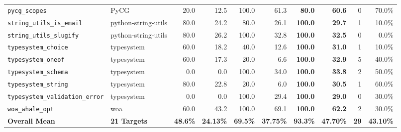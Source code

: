 \documentclass[conference]{IEEEtran}
\begin{document}
\begin{table}[t]
\begin{tabular}{ll|rr|rr|rrr|r}
\texttt{pycg\_scopes} & PyCG & 20.0 & 12.5 & 100.0 & 61.3 & \textbf{80.0} & \textbf{60.6} & 0 & 70.0\% \\
\texttt{string\_utils\_is\_email} & python-string-utils & 80.0 & 24.2 & 80.0 & 26.1 & \textbf{100.0} & \textbf{29.7} & 1 & 10.0\% \\
\texttt{string\_utils\_slugify} & python-string-utils & 80.0 & 26.2 & 100.0 & 32.8 & \textbf{100.0} & \textbf{32.5} & 0 & 0.0\% \\
\texttt{typesystem\_choice} & typesystem & 60.0 & 18.2 & 40.0 & 12.6 & \textbf{100.0} & \textbf{31.0} & 1 & 10.0\% \\
\texttt{typesystem\_oneof} & typesystem & 60.0 & 17.3 & 20.0 & 6.6 & \textbf{100.0} & \textbf{32.9} & 5 & 40.0\% \\
\texttt{typesystem\_schema} & typesystem & 0.0 & 0.0 & 100.0 & 34.0 & \textbf{100.0} & \textbf{33.8} & 2 & 50.0\% \\
\texttt{typesystem\_string} & typesystem & 80.0 & 22.8 & 20.0 & 6.0 & \textbf{100.0} & \textbf{30.5} & 1 & 60.0\% \\
\texttt{typesystem\_validation\_error} & typesystem & 0.0 & 0.0 & 100.0 & 29.4 & \textbf{100.0} & \textbf{29.0} & 0 & 30.0\% \\
\texttt{woa\_whale\_opt} & woa & 60.0 & 43.2 & 100.0 & 69.1 & \textbf{100.0} & \textbf{62.2} & 2 & 30.0\% \\
\midrule
\textbf{Overall Mean} & \textbf{21 Targets} & \textbf{48.6\%} & \textbf{24.13\%} & \textbf{69.5\%} & \textbf{37.75\%} & \textbf{93.3\%} & \textbf{47.70\%} & \textbf{29} & \textbf{43.10\%} \\
\bottomrule
\end{tabular}
\end{table}
\end{document}
